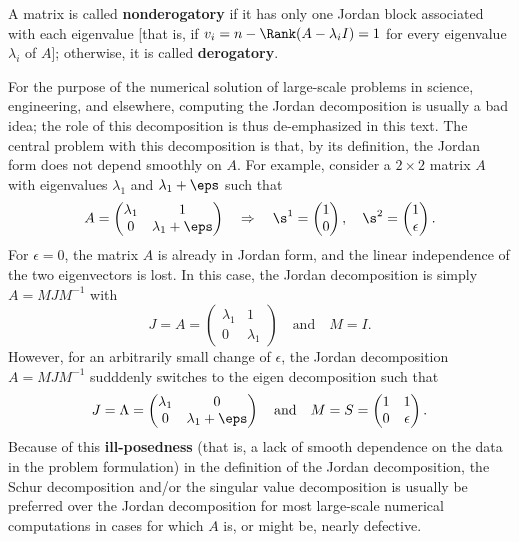 A matrix is called {\bf nonderogatory} if it has only one Jordan block associated with each eigenvalue [that is, if $v_i=n-\Rank(A-\lambda_i I)=1$ for every eigenvalue $\lambda_i$ of $A$];
otherwise, it is called {\bf derogatory}.

For the purpose of the numerical solution of large-scale problems in
science, engineering, and elsewhere, computing the
Jordan decomposition is usually a bad idea; the role of this
decomposition is thus de-emphasized in this text.  The central problem with
this decomposition is that, by its definition, the Jordan form does
not depend smoothly on $A$.  For example, consider a $2\times 2$
matrix $A$ with eigenvalues $\lambda_{1}$ and $\lambda_{1}+\eps$ such
that
\begin{equation}
    A=\begin{pmatrix}
     \lambda_{1} & 1 \\ 0 & \lambda_{1}+\eps
    \end{pmatrix} \quad \Rightarrow \quad
    \s^{1}=\begin{pmatrix} 1 \\ 0 \end{pmatrix}, \quad \s^{2}=\begin{pmatrix} 1 \\ \epsilon \end{pmatrix}.
    \label{A1example}
\end{equation}
For $\epsilon=0$, the matrix $A$ is already in Jordan form, and the
linear independence of the two eigenvectors is lost.  In this case,
the Jordan decomposition is simply $A=MJM^{-1}$ with
\begin{equation*}
    J=A=\begin{pmatrix}
	 \lambda_{1} & 1 \\ 0 & \lambda_{1}
	\end{pmatrix}\quad \textrm{and} \quad M=I.
\end{equation*}
However, for an arbitrarily small change of $\epsilon$, the Jordan
decomposition $A=MJM^{-1}$ sudddenly switches to the eigen decomposition such that
\begin{equation*}
	J=\Lambda=\begin{pmatrix} \lambda_{1} & 0 \\ 0 & \lambda_{1}+\eps
	\end{pmatrix} \quad \textrm{and} \quad M=S =\begin{pmatrix} 1 &
	1 \\ 0 & \epsilon \end{pmatrix}.
\end{equation*}
Because of this {\bf ill-posedness} (that is, a lack of smooth
dependence on the data in the problem formulation) in the definition
of the Jordan decomposition, the Schur decomposition and/or the
singular value decomposition is usually be preferred over the Jordan
decomposition for most large-scale numerical computations in cases for which $A$ is, or
might be, nearly defective.

